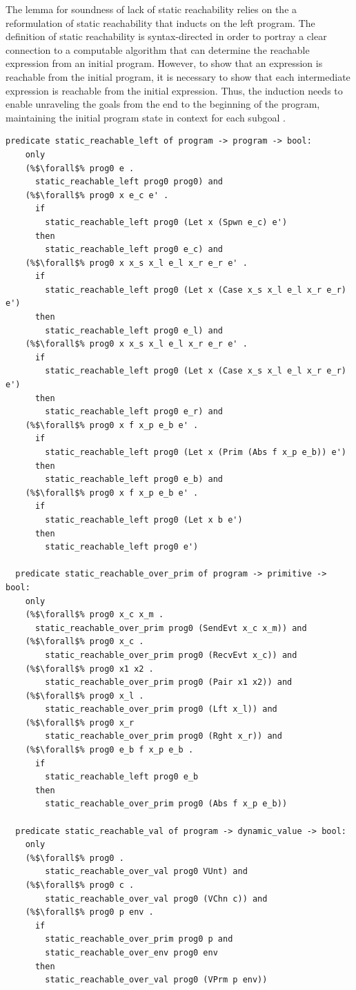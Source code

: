 \documentclass{article}
\begin{document}
The lemma for soundness of lack of static reachability relies on the a reformulation of
static reachability that inducts on the left program.
The definition of static reachability is syntax-directed in
order to portray a clear connection to
a computable algorithm that can determine the reachable expression from an initial program.
However, to show that an expression is reachable from the initial program, it is necessary to
show that each intermediate expression is reachable from the initial expression.  Thus, the
induction needs to enable unraveling the goals from the end to the beginning of the program,
maintaining the initial program state in context for each subgoal .

\begin{lstlisting}[language=logic, escapechar=\%]
  predicate static_reachable_left of program -> program -> bool:
    only
    (%$\forall$% prog0 e .
      static_reachable_left prog0 prog0) and
    (%$\forall$% prog0 x e_c e' .
      if 
        static_reachable_left prog0 (Let x (Spwn e_c) e')
      then
        static_reachable_left prog0 e_c) and
    (%$\forall$% prog0 x x_s x_l e_l x_r e_r e' .
      if
        static_reachable_left prog0 (Let x (Case x_s x_l e_l x_r e_r) e')
      then
        static_reachable_left prog0 e_l) and
    (%$\forall$% prog0 x x_s x_l e_l x_r e_r e' .
      if
        static_reachable_left prog0 (Let x (Case x_s x_l e_l x_r e_r) e')
      then
        static_reachable_left prog0 e_r) and
    (%$\forall$% prog0 x f x_p e_b e' .
      if
        static_reachable_left prog0 (Let x (Prim (Abs f x_p e_b)) e')
      then
        static_reachable_left prog0 e_b) and
    (%$\forall$% prog0 x f x_p e_b e' .
      if
        static_reachable_left prog0 (Let x b e')
      then
        static_reachable_left prog0 e')

  predicate static_reachable_over_prim of program -> primitive -> bool:
    only
    (%$\forall$% prog0 x_c x_m .
      static_reachable_over_prim prog0 (SendEvt x_c x_m)) and
    (%$\forall$% prog0 x_c .
        static_reachable_over_prim prog0 (RecvEvt x_c)) and
    (%$\forall$% prog0 x1 x2 .
        static_reachable_over_prim prog0 (Pair x1 x2)) and
    (%$\forall$% prog0 x_l .
        static_reachable_over_prim prog0 (Lft x_l)) and
    (%$\forall$% prog0 x_r
        static_reachable_over_prim prog0 (Rght x_r)) and
    (%$\forall$% prog0 e_b f x_p e_b . 
      if
        static_reachable_left prog0 e_b 
      then
        static_reachable_over_prim prog0 (Abs f x_p e_b))

  predicate static_reachable_val of program -> dynamic_value -> bool:
    only
    (%$\forall$% prog0 .
        static_reachable_over_val prog0 VUnt) and
    (%$\forall$% prog0 c .
        static_reachable_over_val prog0 (VChn c)) and
    (%$\forall$% prog0 p env .
      if
        static_reachable_over_prim prog0 p and 
        static_reachable_over_env prog0 env
      then
        static_reachable_over_val prog0 (VPrm p env))


\end{lstlisting}
\end{document}
